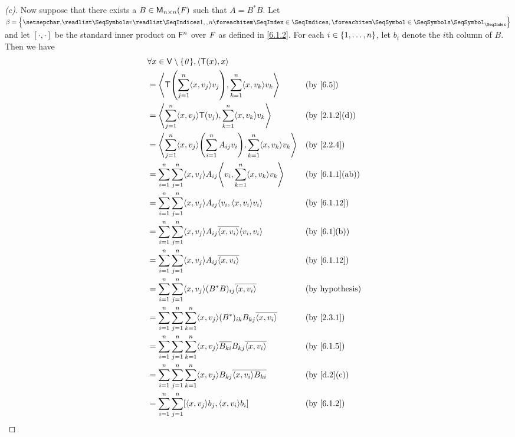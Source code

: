 \begin{proof}[(c)]
	Now suppose that there exists a \(B \in \mathsf{M}_{{n} \times n}({\mathit{F}})\) such that \(A = B^* B\).
	Let \(\beta = \set{\seq{v}{1,,n}}\) and let \([\cdot, \cdot]\) be the standard inner product on \(\mathsf{F}^n\) over \(\mathit{F}\) as defined in \cref{6.1.2}.
	For each \(i \in \left\lbrace1, \dots, n\right\rbrace\), let \(b_i\) denote the \(i\)th column of \(B\).
	Then we have
	\begin{align*}
		 & \forall x \in \V \setminus \set{\zv}, \inn{\T(x), x}                                                                               \\
		 & = \inn{\T\pa{\sum_{j = 1}^n \inn{x, v_j} v_j}, \sum_{k = 1}^n \inn{x, v_k} v_k}                        &  & \by{6.5}               \\
		 & = \inn{\sum_{j = 1}^n \inn{x, v_j} \T(v_j), \sum_{k = 1}^n \inn{x, v_k} v_k}                           &  & \by{2.1.2}[d]          \\
		 & = \inn{\sum_{j = 1}^n \inn{x, v_j} \pa{\sum_{i = 1}^n A_{i j} v_i}, \sum_{k = 1}^n \inn{x, v_k} v_k}   &  & \by{2.2.4}             \\
		 & = \sum_{i = 1}^n \sum_{j = 1}^n \inn{x, v_j} A_{i j} \inn{v_i, \sum_{k = 1}^n \inn{x, v_k} v_k}        &  & \by{6.1.1}[ab]         \\
		 & = \sum_{i = 1}^n \sum_{j = 1}^n \inn{x, v_j} A_{i j} \inn{v_i, \inn{x, v_i} v_i}                       &  & \by{6.1.12}            \\
		 & = \sum_{i = 1}^n \sum_{j = 1}^n \inn{x, v_j} A_{i j} \conj{\inn{x, v_i}} \inn{v_i, v_i}                &  & \by{6.1}[b]            \\
		 & = \sum_{i = 1}^n \sum_{j = 1}^n \inn{x, v_j} A_{i j} \conj{\inn{x, v_i}}                               &  & \by{6.1.12}            \\
		 & = \sum_{i = 1}^n \sum_{j = 1}^n \inn{x, v_j} (B^* B)_{i j} \conj{\inn{x, v_i}}                         &  & \text{(by hypothesis)} \\
		 & = \sum_{i = 1}^n \sum_{j = 1}^n \sum_{k = 1}^n \inn{x, v_j} (B^*)_{i k} B_{k j} \conj{\inn{x, v_i}}    &  & \by{2.3.1}             \\
		 & = \sum_{i = 1}^n \sum_{j = 1}^n \sum_{k = 1}^n \inn{x, v_j} \conj{B_{k i}} B_{k j} \conj{\inn{x, v_i}} &  & \by{6.1.5}             \\
		 & = \sum_{i = 1}^n \sum_{j = 1}^n \sum_{k = 1}^n \inn{x, v_j} B_{k j} \conj{\inn{x, v_i} B_{k i}}        &  & \by{d.2}[c]            \\
		 & = \sum_{i = 1}^n \sum_{j = 1}^n [\inn{x, v_j} b_j, \inn{x, v_i} b_i]                                   &  & \by{6.1.2}             \\

\end{align*}
\end{proof}
